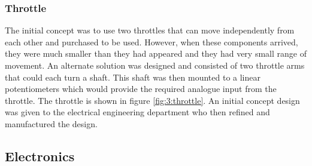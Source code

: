 		\subsubsection{Throttle}
		The initial concept was to use two throttles that can move independently from each other and %
		purchased to be used. However, when these components arrived, they were much smaller than they had appeared and they had very small range of movement. An alternate solution was designed and consisted of two throttle arms that could each turn a shaft. This shaft was then mounted to a linear potentiometers which would provide the required analogue input from the throttle. The throttle is shown in figure \ref{fig:3:throttle}. An initial concept design was given to the electrical engineering department who then refined and manufactured the design. 
		\par
	\subsection{Electronics}\par
